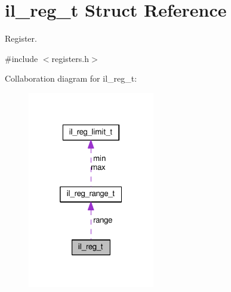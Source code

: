 \hypertarget{structil__reg__t}{}\section{il\+\_\+reg\+\_\+t Struct Reference}
\label{structil__reg__t}


Register.  




{\ttfamily \#include $<$registers.\+h$>$}



Collaboration diagram for il\+\_\+reg\+\_\+t\+:\nopagebreak
\begin{figure}[H]
\begin{center}
\leavevmode
\includegraphics[width=157pt]{structil__reg__t__coll__graph}
\end{center}
\end{figure}
